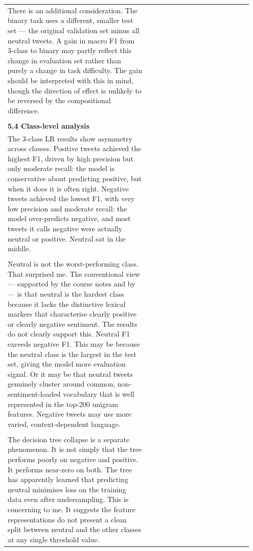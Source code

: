 \documentclass[11pt]{article}
\begin{document}
\begin{longtable}{|p{0.55\linewidth}|p{0.40\linewidth}|}
\hline
\rule{0pt}{3.5cm} & \\
\hline
There is an additional consideration. The binary task uses a different, smaller test set --- the original validation set minus all neutral tweets. A gain in macro F1 from 3-class to binary may partly reflect this change in evaluation set rather than purely a change in task difficulty. The gain should be interpreted with this in mind, though the direction of effect is unlikely to be reversed by the compositional difference. & \\[2pt]
\hline
\rule{0pt}{3.5cm} & \\
\hline
\multicolumn{2}{|l|}{\textbf{5.4 Class-level analysis}} \\[2pt]
\hline
The 3-class LR results show asymmetry across classes. Positive tweets achieved the highest F1, driven by high precision but only moderate recall: the model is conservative about predicting positive, but when it does it is often right. Negative tweets achieved the lowest F1, with very low precision and moderate recall: the model over-predicts negative, and most tweets it calls negative were actually neutral or positive. Neutral sat in the middle. & \\[2pt]
\hline
\rule{0pt}{3.5cm} & \\
\hline
Neutral is not the worst-performing class. That surprised me. The conventional view --- supported by the course notes and by --- is that neutral is the hardest class because it lacks the distinctive lexical markers that characterise clearly positive or clearly negative sentiment. The results do not clearly support this. Neutral F1 exceeds negative F1. This may be because the neutral class is the largest in the test set, giving the model more evaluation signal. Or it may be that neutral tweets genuinely cluster around common, non-sentiment-loaded vocabulary that is well represented in the top-200 unigram features. Negative tweets may use more varied, context-dependent language. & \\[2pt]
\hline
\rule{0pt}{3.5cm} & \\
\hline
The decision tree collapse is a separate phenomenon. It is not simply that the tree performs poorly on negative and positive. It performs near-zero on both. The tree has apparently learned that predicting neutral minimises loss on the training data even after undersampling. This is concerning to me. It suggests the feature representations do not present a clean split between neutral and the other classes at any single threshold value. & \\[2pt]

\end{longtable}
\end{document}
